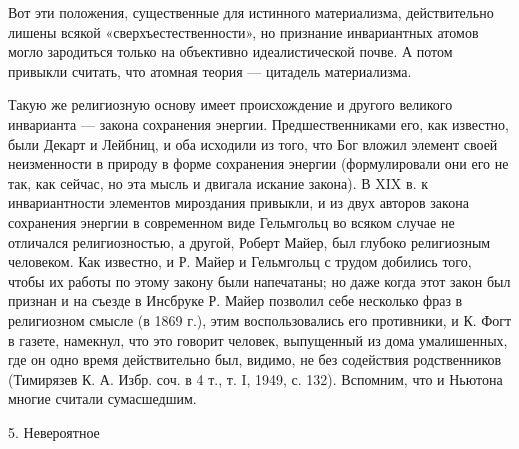 Вот эти положения, существенные для истинного материализма, действительно
лишены всякой «сверхъестественности», но признание инвариантных атомов могло
зародиться только на объективно идеалистической почве. А потом привыкли
считать, что атомная теория --- цитадель материализма.

Такую же религиозную основу имеет происхождение и другого великого инварианта ---
закона сохранения энергии. Предшественниками его, как известно, были Декарт и
Лейбниц, и оба исходили из того, что Бог вложил элемент своей неизменности в
природу в форме сохранения энергии (формулировали они его не так, как сейчас,
но эта мысль и двигала искание закона). В XIX в. к инвариантности элементов
мироздания привыкли, и из двух авторов закона сохранения энергии в современном
виде Гельмгольц во всяком случае не отличался религиозностью, а другой, Роберт
Майер, был глубоко религиозным человеком. Как известно, и Р. Майер и Гельмгольц
с трудом добились того, чтобы их работы по этому закону были напечатаны; но
даже когда этот закон был признан и на съезде в Инсбруке Р. Майер позволил себе
несколько фраз в религиозном смысле (в 1869 г.), этим воспользовались его
противники, и К. Фогт в газете, намекнул, что это говорит человек, выпущенный
из дома умалишенных, где он одно время действительно был, видимо, не без
содействия родственников (Тимирязев К. А. Избр. соч. в 4 т., т. I, 1949, с.
132). Вспомним, что и Ньютона многие считали сумасшедшим.

5. Невероятное

